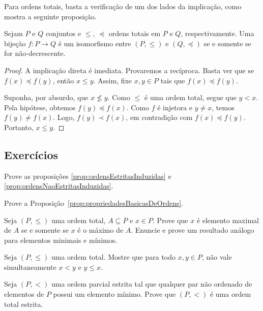 Para ordens totais, basta a verificação de um dos lados da implicação, como mostra a seguinte proposição.

\begin{proposition}[$\BST$]\label{prop:isomorfismoMonotonoEmOrdensTotais}
    Sejam $P$ e $Q$ conjuntos e $\leq$, $\preceq$ ordens totais em $P$ e $Q$, respectivamente.
    Uma bijeção $f : P \to Q$ é um isomorfismo entre $(P, \leq)$ e $(Q, \preceq)$ se e somente se for não-decrescente.
\end{proposition}

\begin{proof}
    A implicação direta é imediata.
    Provaremos a recíproca.
    Basta ver que se $f(x) \preceq f(y)$, então $x \leq y$.
    Assim, fixe $x,y\in P$ tais que $f(x)\preceq f(y)$.

    Suponha, por absurdo, que $x\not\le y$.
    Como $\le$ é uma ordem total, segue que $y<x$.
    Pela hipótese, obtemos $f(y)\preceq f(x)$.
    Como $f$ é injetora e $y\neq x$, temos $f(y)\neq f(x)$.
    Logo, $f(y)\prec f(x)$, em contradição com $f(x)\preceq f(y)$.
    Portanto, $x\le y$.
\end{proof}
\subsection*{Exercícios}
\begin{exercise}\label{exr:ordensEstritasENaoEstritas}
    Prove as proposições \ref{prop:ordensEstritasInduzidas} e \ref{prop:ordensNaoEstritasInduzidas}.
\end{exercise}
\begin{exercise}\label{exr:propriedadesBasicasDeOrdens}
    Prove a Proposição~\ref{prop:propriedadesBasicasDeOrdens}.
\end{exercise}
\begin{exercise}[$\BST$]
    Seja $(P, \leq)$ uma ordem total, $A\subseteq P$ e $x \in P$.
    Prove que $x$ é elemento maximal de $A$ se e somente se $x$ é o máximo de $A$.
    Enuncie e prove um resultado análogo para elementos minimais e mínimos.
\end{exercise}

\begin{exercise}[$\BST$]
    Seja $(P, \leq)$ uma ordem total.
    Mostre que para todo $x, y \in P$, não vale simultaneamente $x<y$ e $y\leq x$.
\end{exercise}

\begin{exercise}[$\BST$]
    Seja $(P, <)$ uma ordem parcial estrita tal que qualquer par não ordenado de elementos de $P$ possui um elemento mínimo.
    Prove que $(P, <)$ é uma ordem total estrita.
\end{exercise}

